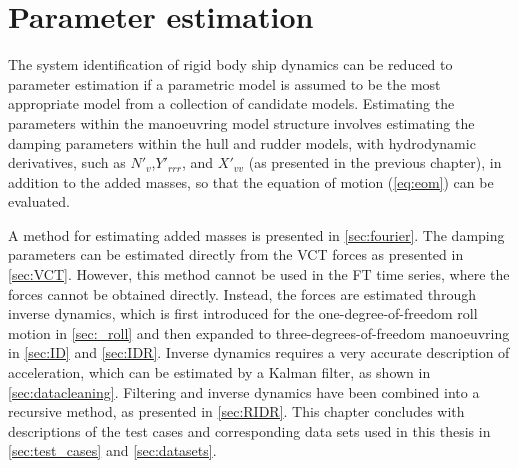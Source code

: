 \chapter{Parameter estimation}\label{ch:methods}
\noindent The system identification of rigid body ship dynamics can be reduced to parameter estimation if a parametric model is assumed to be the most appropriate model from a collection of candidate models. Estimating the parameters within the manoeuvring model structure involves estimating the damping parameters within the hull and rudder models, with hydrodynamic derivatives, such as $N'_v$,$Y'_{rrr}$, and $X'_{vv}$ (as presented in the previous chapter), in addition to the added masses, so that the equation of motion (\autoref{eq:eom}) can be evaluated.

A method for estimating added masses is presented in \autoref{sec:fourier}. The damping parameters can be estimated directly from the VCT forces as presented in \autoref{sec:VCT}. However, this method cannot be used in the FT time series, where the forces cannot be obtained directly. Instead, the forces are estimated through inverse dynamics, which is first introduced for the one-degree-of-freedom roll motion in \autoref{sec:_roll} and then expanded to three-degrees-of-freedom manoeuvring in \autoref{sec:ID} and \autoref{sec:IDR}. Inverse dynamics requires a very accurate description of acceleration, which can be estimated by a Kalman filter, as shown in \autoref{sec:datacleaning}. Filtering and inverse dynamics have been combined into a recursive method, as presented in \autoref{sec:RIDR}. This chapter concludes with descriptions of the test cases and corresponding data sets used in this thesis in \autoref{sec:test_cases} and \ref{sec:datasets}.

%
%
%
%

